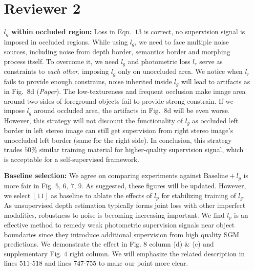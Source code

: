 \documentclass[10pt,twocolumn,letterpaper]{article}
\begin{document}
\vspace{-3.5mm}
\section*{Reviewer 2}
\vspace{-1.5mm}
\noindent\textbf{$l_g$ within occluded region:}
Loss in Eqn.~$13$ is correct, no supervision signal is imposed in occluded regions. 
While using $l_g$, we need to face multiple noise sources, including noise from depth border, semantics border and morphing process itself. %
To overcome it, we need $l_g$ and photometric loss $l_r$ serve as constraints to \textit{each other}, imposing $l_g$ only on unoccluded area. 
We notice when $l_r$ fails to provide enough constrains, noise inherited inside $l_g$ will lead to artifacts as in Fig.~$8$d (\textit{Paper}).
The low-textureness and frequent occlusion make image area around two sides of foreground objects fail to provide strong constrain. 
If we impose $l_g$ around occluded area, the artifacts in Fig.~$8$d will be even worse. 
However, this strategy will not discount the functionality of $l_g$ as occluded left border in left stereo image can still get supervision from right stereo image's unoccluded left border (same for the right side). 
In conclusion, this strategy trades $50$\% similar training material for higher-quality supervision signal, which is acceptable for a self-supervised framework. %

\noindent\textbf{Baseline selection:} 
We agree on comparing experiments against $\text{Baseline} + {l_p}$ is more fair in Fig. $5$, $6$, $7$, $9$. 
As suggested, these figures will be updated. 
However, we select $[11]$ as baseline to ablate the effects of $l_p$ for stabilizing training of $l_g$. 
As unsupervised depth estimation typically forms joint loss with other imperfect modalities, robustness to noise is becoming increasing important. %
We find ${l_p}$ is an effective method to remedy weak photometric supervision signals near object boundaries since they introduce additional supervision from high quality SGM predictions. 
We demonstrate the effect in Fig. $8$ column (d) \& (e) and supplementary Fig. $4$ right column. 
We will emphasize the related description in lines $511\text{-}518$ and lines $747\text{-}755$ to make our point more clear. 
\end{document}
